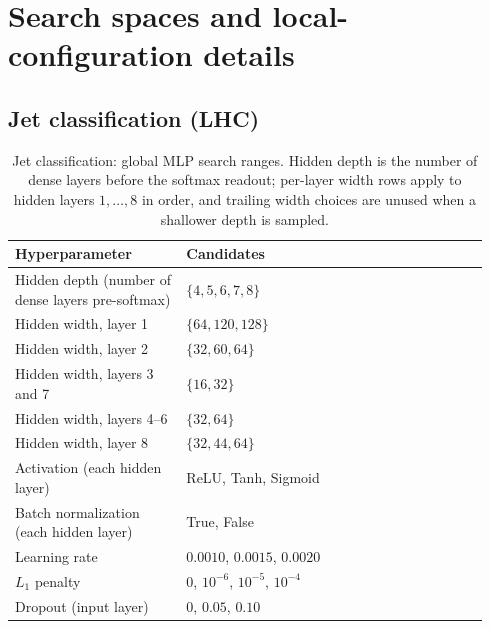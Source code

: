 \documentclass[11pt]{article}
\begin{document}
\appendix
\section{Search spaces and local-configuration details}

\subsection{Jet classification (LHC)}
\label{app:jet-search-config}

\begin{table}[t]
  \centering
  \footnotesize
  \caption{Jet classification: global MLP search ranges. Hidden depth is the number of dense layers before the softmax readout; per-layer width rows apply to hidden layers $1,\ldots,8$ in order, and trailing width choices are unused when a shallower depth is sampled.}
  \label{tab:mlp-parameter-table}
  \begin{tabular}{@{}p{0.34\linewidth}p{0.60\linewidth}@{}}
    \toprule
    \textbf{Hyperparameter} & \textbf{Candidates} \\
    \midrule
    Hidden depth (number of dense layers pre-softmax) & $\{4,5,6,7,8\}$ \\
    Hidden width, layer 1 & $\{64,120,128\}$ \\
    Hidden width, layer 2 & $\{32,60,64\}$ \\
    Hidden width, layers 3 and 7 & $\{16,32\}$ \\
    Hidden width, layers 4--6 & $\{32,64\}$ \\
    Hidden width, layer 8 & $\{32,44,64\}$ \\
    Activation (each hidden layer) & ReLU, Tanh, Sigmoid \\
    Batch normalization (each hidden layer) & True, False \\
    Learning rate & $0.0010$, $0.0015$, $0.0020$ \\
    $L_1$ penalty & $0$, $10^{-6}$, $10^{-5}$, $10^{-4}$ \\
    Dropout (input layer) & $0$, $0.05$, $0.10$ \\
    \bottomrule
  \end{tabular}
\end{table}
\end{document}
